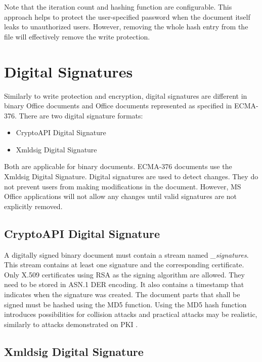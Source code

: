 \documentclass[11pt,oneside]{fithesis2}
\begin{document}
Note that the iteration count and hashing function are configurable. This approach helps to protect the user-specified password when the document itself leaks to unauthorized users. However, removing the whole hash entry from the file will effectively remove the write protection.

\section{Digital Signatures}\label{data_integrity}

Similarly to write protection and encryption, digital signatures are different in binary Office documents and Office documents represented as specified in ECMA-376. There are two digital signature formats:

\begin{itemize}
\setlength\itemsep{0.1em}
	\item{CryptoAPI Digital Signature}
	\item{Xmldsig Digital Signature}
\end{itemize}

Both are applicable for binary documents. ECMA-376 documents use the Xmldsig Digital Signature. Digital signatures are used to detect changes. They do not prevent users from making modifications in the document. However, MS Office applications will not allow any changes until valid signatures are not explicitly removed.

\subsection{CryptoAPI Digital Signature} 

A digitally signed binary document must contain a stream named \textit{\_signatures}. This stream contains at least one signature and the corresponding certificate. Only X.509 certificates using RSA as the signing algorithm are allowed. They need to be stored in ASN.1 DER encoding. It also contains a timestamp that indicates when the signature was created. The document parts that shall be signed must be hashed using the MD5 function. Using the MD5 hash function introduces possibilities for collision attacks and practical attacks may be realistic, similarly to attacks demonstrated on PKI \cite{md5_vulnerable}. 


\subsection{Xmldsig Digital Signature}
\end{document}
